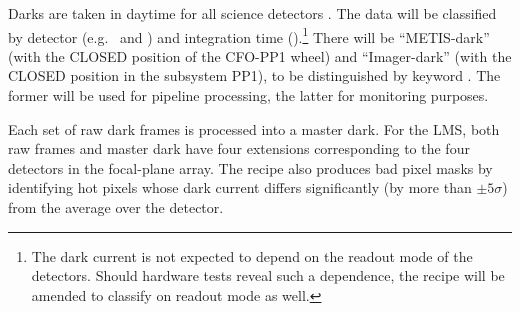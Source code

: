 Darks are taken in daytime for all science detectors
\cite{METIS-calibration_plan}. The data will be classified by detector
(e.g.~ and ) and integration time
().\footnote{The dark current is not expected to depend on the readout mode of the detectors. Should hardware tests reveal such a dependence, the recipe will be amended to classify on readout mode as well.} There will be ``METIS-dark''
(with the CLOSED position of the CFO-PP1 wheel) and ``Imager-dark''
(with the CLOSED position in the subsystem PP1), to be distinguished
by keyword \TBD. The former will be used for pipeline processing, the
latter for monitoring purposes.

Each set of raw dark frames is processed into a master dark. For the
LMS, both raw frames and master dark have four extensions
corresponding to the four detectors in the focal-plane array. The
recipe also produces bad pixel masks by identifying hot pixels whose
dark current differs significantly (by more than $\pm 5\sigma$) from
the average over the detector.

